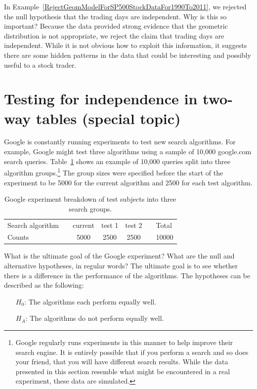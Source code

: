 \begin{example}{In Example~\ref{RejectGeomModelForSP500StockDataFor1990To2011}, we rejected the null hypothesis that the trading days are independent. Why is this so important?}
Because the data provided strong evidence that the geometric distribution is not appropriate, we reject the claim that trading days are independent. While it is not obvious how to exploit this information, it suggests there are some hidden patterns in the data that could be interesting and possibly useful to a stock trader.
\end{example}


\section{Testing for independence in two-way tables (special topic)}
\label{twoWayTablesAndChiSquare}


Google is constantly running experiments to test new search algorithms. For example, Google might test three algorithms using a sample of 10,000 google.com search queries. Table~\ref{googleSearchAlgorithmByAlgorithmOnly} shows an example of 10,000 queries split into three algorithm groups.\footnote{Google regularly runs experiments in this manner to help improve their search engine. It is entirely possible that if you perform a search and so does your friend, that you will have different search results. While the data presented in this section resemble what might be encountered in a real experiment, these data are simulated.} The group sizes were specified before the start of the experiment to be 5000 for the current algorithm and 2500 for each test algorithm.

\begin{table}[h]
\centering
\begin{tabular}{ll ccc ll}
\hline
Search algorithm	 & \hspace{1mm} & current & test 1 & test 2 & \hspace{1mm} & Total \\
Counts &		& 5000 & 2500 & 2500 & & 10000 \\
\hline
\end{tabular}
\caption{Google experiment breakdown of test subjects into three search groups.}
\label{googleSearchAlgorithmByAlgorithmOnly}
\end{table}

\begin{example}{What is the ultimate goal of the Google experiment? What are the null and alternative hypotheses, in regular words?}
The ultimate goal is to see whether there is a difference in the performance of the algorithms. The hypotheses can be described as the following:
\begin{itemize}
\item[$H_0$:] The algorithms each perform equally well.
\item[$H_A$:] The algorithms do not perform equally well.
\end{itemize}
\end{example}

